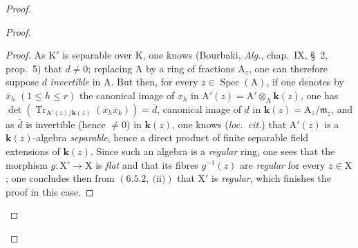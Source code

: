 \begin{proof}
\begin{proof}
\begin{proof}
As $\mathrm{K}'$ is separable over $\mathrm{K}$, one knows (Bourbaki, \emph{Alg.}, chap.~IX, \S~2, prop.~5)
that $d\neq 0$; replacing $\mathrm{A}$ by a ring of fractions $\mathrm{A}_z$, one can therefore suppose $d$
\emph{invertible} in $\mathrm{A}$. But then, for every $z\in\operatorname{Spec}(\mathrm{A})$, if one denotes by $\overline{x}_h$ $(1\leqslant h\leqslant r)$
the canonical image of $x_h$ in $\mathrm{A}'(z)=\mathrm{A}'\otimes_\mathrm{A}\boldsymbol{k}(z)$, one has $\det(\operatorname{Tr}_{\mathrm{A}'(z)/\boldsymbol{k}(z)}(\overline{x}_h\overline{x}_k))=\overline{d}$, canonical
image of $d$ in $\boldsymbol{k}(z)=\mathrm{A}_z/\mathfrak{m}_z$, and as $\overline{d}$ is invertible (hence $\neq 0$) in $\boldsymbol{k}(z)$, one
knows (\emph{loc.~cit.}) that $\mathrm{A}'(z)$ is a $\boldsymbol{k}(z)$-algebra \emph{separable}, hence a direct product of finite separable field
extensions of $\boldsymbol{k}(z)$. Since such an algebra is a \emph{regular} ring, one sees
that the morphism $g:\mathrm{X}'\to\mathrm{X}$ is \emph{flat} and that its fibres $g^{-1}(z)$ are \emph{regular} for every
$z\in\mathrm{X}$; one concludes then from $(6.5.2,~\text{(ii)})$ that $\mathrm{X}'$ is \emph{regular}, which finishes the proof in this case.
\end{proof}


\end{proof}
\end{proof}
